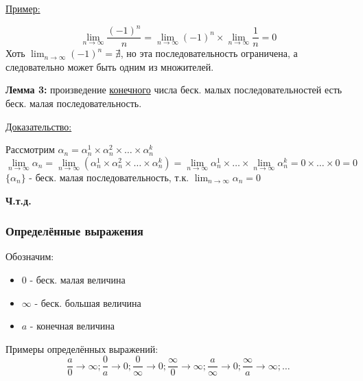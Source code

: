 \documentclass[12pt]{article}
\begin{document}
    \underline{Пример:}
    \begin{adjustwidth}{1.5em}{1.5em}
        \[ \lim_{n\to\infty} \frac{(-1)^n}{n} = \lim_{n\to\infty}(-1)^n \times \lim_{n\to\infty}\frac{1}{n} = 0 \]
        Хоть $\lim_{n\to\infty} (-1)^n = \nexists$, но эта последовательность ограничена, а следовательно может быть одним из множителей.
    \end{adjustwidth}

    \noindent\textbf{Лемма 3:} произведение \underline{конечного} числа беск. малых последовательностей есть беск. малая последовательность.\par\noindent
    \underline{Доказательство:}\par
    \begin{adjustwidth}{1.5em}{1.5em}
        Рассмотрим $\alpha_n = \alpha_n^1 \times \alpha_n^2 \times \dots \times \alpha_n^k$\\
        \[ \lim_{n\to\infty} \alpha_n = \lim_{n\to\infty}(\alpha_n^1 \times \alpha_n^2 \times \dots \times \alpha_n^k) = \lim_{n\to\infty}\alpha_n^1 \times \dots \times \lim_{n\to\infty}\alpha_n^k = 0 \times \dots \times 0 = 0 \]
        $\{\alpha_n\}$ - беск. малая последовательность, т.к. $\lim_{n\to\infty}\alpha_n = 0$
        \begin{center}
            \textbf{Ч.т.д.}
        \end{center}
    \end{adjustwidth}

    \subsubsection*{Определённые выражения}
    \noindent Обозначим:
    \begin{itemize}
        \item $0$ - беск. малая величина
        \item $\infty$ - беск. большая величина
        \item $a$ - конечная величина
    \end{itemize}
    Примеры определённых выражений:
    \[ 
        \frac{a}{0} \to \infty; \frac{0}{a} \to 0; \frac{0}{\infty} \to 0; \frac{\infty}{0} \to \infty; \frac{a}{\infty} \to 0; \frac{\infty}{a} \to \infty; \dots
    \]
\end{document}
